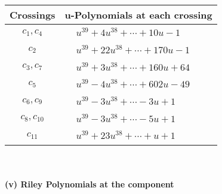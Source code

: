 \documentclass[1p]{elsarticle_modified}
\theoremstyle{definition}
\begin{document}
\begin{tabular}{m{50pt}|m{274pt}}
Crossings & \hspace{64pt}u-Polynomials at each crossing \\
\hline $$\begin{aligned}c_{1},c_{4}\end{aligned}$$&$\begin{aligned}
&u^{39}+4 u^{38}+\cdots+10 u-1
\end{aligned}$\\
\hline $$\begin{aligned}c_{2}\end{aligned}$$&$\begin{aligned}
&u^{39}+22 u^{38}+\cdots+170 u-1
\end{aligned}$\\
\hline $$\begin{aligned}c_{3},c_{7}\end{aligned}$$&$\begin{aligned}
&u^{39}+3 u^{38}+\cdots+160 u+64
\end{aligned}$\\
\hline $$\begin{aligned}c_{5}\end{aligned}$$&$\begin{aligned}
&u^{39}-4 u^{38}+\cdots+602 u-49
\end{aligned}$\\
\hline $$\begin{aligned}c_{6},c_{9}\end{aligned}$$&$\begin{aligned}
&u^{39}-3 u^{38}+\cdots-3 u+1
\end{aligned}$\\
\hline $$\begin{aligned}c_{8},c_{10}\end{aligned}$$&$\begin{aligned}
&u^{39}-3 u^{38}+\cdots-5 u+1
\end{aligned}$\\
\hline $$\begin{aligned}c_{11}\end{aligned}$$&$\begin{aligned}
&u^{39}+23 u^{38}+\cdots+u+1
\end{aligned}$\\
\hline
\end{tabular}\\~\\
\newpage\renewcommand{\arraystretch}{1}
\flushleft \textbf{(v) Riley Polynomials at the component}\newline \\
\end{document}
